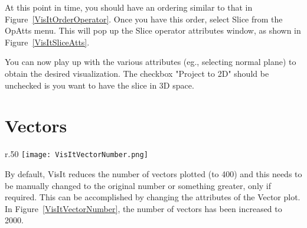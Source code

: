 \begin{figure}
  \centering
  \vspace{-20pt}
  \hspace{50pt}
  \caption{}
  \label{}
\end{figure}


At this point in time, you should have an ordering similar to that in
Figure~\ref{VisItOrderOperator}.  Once you have this order, select
Slice from the OpAtts menu. This will pop up the Slice operator
attributes window, as shown in Figure~\ref{VisItSliceAtts}.


You can now play up with the various attributes (eg., selecting normal
plane) to obtain the desired visualization. The checkbox "Project to
2D" should be unchecked is you want to have the slice in 3D space.

\section{Vectors}

\begin{wrapfigure}{r}{.50\textwidth}
  \center
  \vspace{-40pts}
  \texttt{[image: VisItVectorNumber.png]}
  \caption{Increasing the number of Vectors}
  \vspace{-20pts}
  \label{VisItVectorNumber}
\end{wrapfigure}


By default, VisIt reduces the number of vectors plotted (to 400) and
this needs to be manually changed to the original number or something
greater, only if required.  This can be accomplished by changing the
attributes of the Vector plot. In Figure~\ref{VisItVectorNumber}, the
number of vectors has been increased to 2000.


